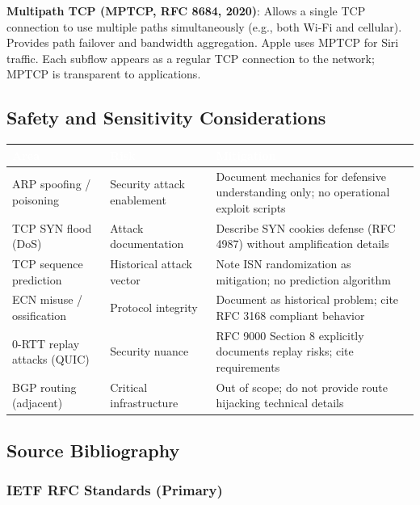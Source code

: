 \documentclass[11pt,letterpaper]{article}
\newcommand{\tableheader}[1]{\textbf{\sffamily\textcolor{white}{#1}}}
\begin{document}
\textbf{Multipath TCP (MPTCP, RFC 8684, 2020)}: Allows a single TCP connection to use multiple paths simultaneously (e.g., both Wi-Fi and cellular). Provides path failover and bandwidth aggregation. Apple uses MPTCP for Siri traffic. Each subflow appears as a regular TCP connection to the network; MPTCP is transparent to applications.

\subsection{Safety and Sensitivity Considerations}

\begin{center}
\begin{tabularx}{\textwidth}{L{3.5cm}L{2.5cm}X}
\toprule
{}
\tableheader{Area} & \tableheader{Risk} & \tableheader{Mitigation} \\
\midrule
ARP spoofing / poisoning & Security attack enablement & Document mechanics for defensive understanding only; no operational exploit scripts \\
TCP SYN flood (DoS) & Attack documentation & Describe SYN cookies defense (RFC 4987) without amplification details \\
TCP sequence prediction & Historical attack vector & Note ISN randomization as mitigation; no prediction algorithm \\
ECN misuse / ossification & Protocol integrity & Document as historical problem; cite RFC 3168 compliant behavior \\
0-RTT replay attacks (QUIC) & Security nuance & RFC 9000 Section 8 explicitly documents replay risks; cite requirements \\
BGP routing (adjacent) & Critical infrastructure & Out of scope; do not provide route hijacking technical details \\
\bottomrule
\end{tabularx}
\end{center}

\subsection{Source Bibliography}

\subsubsection{IETF RFC Standards (Primary)}
\end{document}
